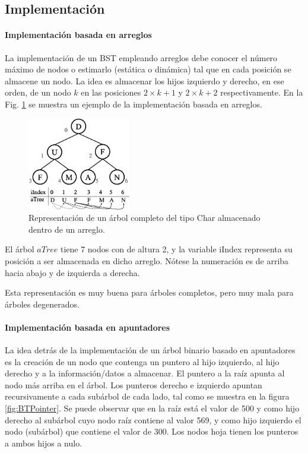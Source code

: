 \subsection{Implementación}

\paragraph{Implementación basada en arreglos}

La implementación de un BST empleando arreglos debe conocer el número máximo de nodos o estimarlo (estática o dinámica) tal que en cada posición se almacene un nodo. La idea es almacenar los hijos izquierdo y derecho, en ese orden, de un nodo $k$ en las posiciones $2 \times k + 1$ y $2 \times k + 2$ respectivamente. En la Fig. \ref{fig:vectorbinTree} se muestra un ejemplo de la implementación basada en arreglos.

\begin{figure}[htpb!]
  \begin{center}
    \includegraphics[width=0.4\textwidth]{images/vectorbinTree.eps}
  \end{center}
  \caption{Representación de un árbol completo del tipo Char almacenado dentro de un arreglo.}
  \label{fig:vectorbinTree}
\end{figure}

El árbol $aTree$ tiene 7 nodos con de altura 2, y la variable iIndex representa su posición a ser almacenada en dicho arreglo. Nótese la numeración es de arriba hacia abajo y de izquierda a derecha.

Esta representación es muy buena para árboles completos, pero muy mala para árboles degenerados.

\paragraph{Implementación basada en apuntadores}

La idea detrás de la implementación de un árbol binario basado en apuntadores es la creación de un nodo que contenga un puntero al hijo izquierdo, al hijo derecho y a la información/datos a almacenar. El puntero a la raíz apunta al nodo más arriba en el árbol. Los punteros derecho e izquierdo apuntan recursivamente a cada subárbol de cada lado, tal como se muestra en la figura \ref{fig:BTPointer}. Se puede observar que en la raíz está el valor de 500 y como hijo derecho al subárbol cuyo nodo raíz contiene al valor 569, y como hijo izquierdo el nodo (subárbol) que contiene el valor de 300. Los nodos hoja tienen los punteros a ambos hijos a nulo.


